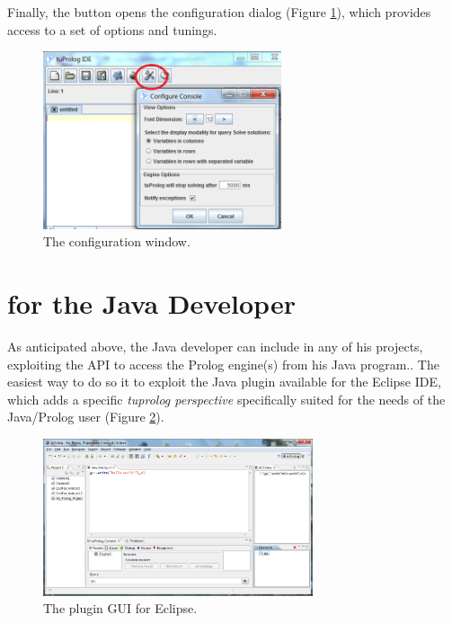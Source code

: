 Finally, the  button opens the configuration dialog (Figure \ref{fig:gui-configuration}), which provides access to a set of options and tunings.

\begin{figure}
\centering
\includegraphics[width=7cm]{images/gui-config}
\caption{The configuration window.}
\label{fig:gui-configuration}
\end{figure}

\section{\tuprolog{} for the Java Developer}
\label{sec:java-user-perspective}

As anticipated above, the Java developer can include \tuprolog{} in any of his projects, exploiting the \tuprolog{} API to access the Prolog engine(s) from his Java program..
%
The easiest way to do so it to exploit the Java plugin available for the Eclipse IDE, which adds a specific \textit{tuprolog perspective} specifically suited for the needs of the Java/Prolog user (Figure \ref{fig:tuprologPluginGUI}).

\begin{figure}
  \includegraphics[width=300px]{images/tuprologPluginGUI.png}
  \caption{The \tuprolog{} plugin GUI for Eclipse.}\label{fig:tuprologPluginGUI}
\end{figure}

